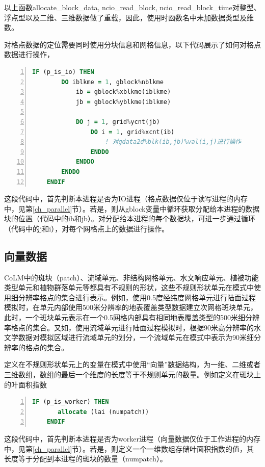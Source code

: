 \documentclass[a4paper,12pt,twoside]{article}
\begin{document}
以上函数allocate\_block\_data, ncio\_read\_block, ncio\_read\_block\_time对整型、浮点型以及二维、三维数据做了重载，因此，使用时函数名中未加数据类型及维数。

对格点数据的定位需要同时使用分块信息和网格信息，以下代码展示了如何对格点数据进行操作，
\begin{lstlisting}[language=fortran, basicstyle=\linespread{1.0}\footnotesize\ttfamily, commentstyle=\color{olive}, numbers=left, numberstyle=\tiny, xleftmargin=1.5em,xrightmargin=0em, aboveskip=1em]
    IF (p_is_io) THEN
        DO iblkme = 1, gblock%nblkme
            ib = gblock%xblkme(iblkme)
            jb = gblock%yblkme(iblkme)

            DO j = 1, grid%ycnt(jb)
                DO i = 1, grid%xcnt(ib)
                    ! 对gdata2d%blk(ib,jb)%val(i,j)进行操作
                ENDDO
            ENDDO
        ENDDO
    ENDIF
\end{lstlisting}
这段代码中，首先判断本进程是否为IO进程（格点数据仅位于读写进程的内存中，见第\ref{ch_parallel}节）。若是，则从gblock变量中循环获取分配给本进程的数据块的位置（代码中的ib和jb）。对分配给本进程的每个数据块，可进一步通过循环（代码中的j和i），对每个网格点上的数据进行操作。

\subsection{向量数据}

CoLM中的斑块（patch）、流域单元、非结构网格单元、水文响应单元、植被功能类型单元和植物群落单元等都具有不规则的形状，这些不规则形状单元在模式中使用细分辨率格点的集合进行表示。例如，使用0.5\textdegree 度经纬度网格单元进行陆面过程模拟时，在单元内部使用500米分辨率的地表覆盖类型数据建立次网格斑块单元，此时，一个斑块单元表示在一个0.5\textdegree 网格内部具有相同地表覆盖类型的500米细分辨率格点的集合。又如，使用流域单元进行陆面过程模拟时，根据90米高分辨率的水文学数据对模拟区域进行流域单元的划分，一个流域单元在模式中表示为90米细分辨率的格点的集合。

定义在不规则形状单元上的变量在模式中使用“向量”数据结构，为一维、二维或者三维数组，数组的最后一个维度的长度等于不规则单元的数量。例如定义在斑块上的叶面积指数
\begin{lstlisting}[language=fortran, basicstyle=\linespread{1.0}\footnotesize\ttfamily, commentstyle=\color{olive}, numbers=left, numberstyle=\tiny, xleftmargin=1.5em,xrightmargin=0em, aboveskip=1em]
    IF (p_is_worker) THEN
       allocate (lai (numpatch))
    ENDIF
\end{lstlisting}
这段代码中，首先判断本进程是否为worker进程（向量数据仅位于工作进程的内存中，见第\ref{ch_parallel}节）。若是，则定义一个一维数组存储叶面积指数的值，其长度等于分配到本进程的斑块的数量（numpatch）。
\end{document}
